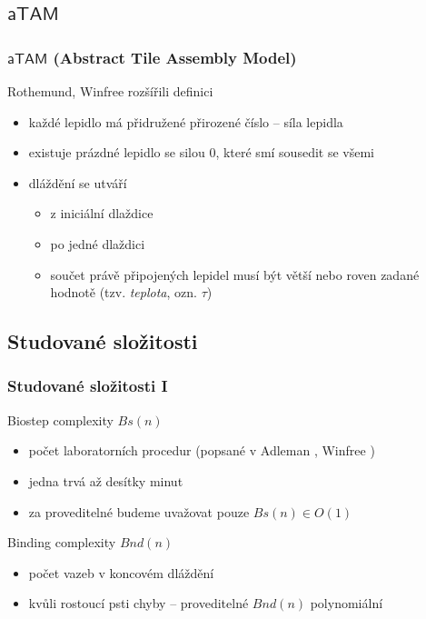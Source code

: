\documentclass[10pt]{beamer}
\newcommand{\atam}{\mathsf{aTAM}}
\theoremstyle{definition}
\theoremstyle{remark}
\begin{document}
\subsection{$\atam$}
\begin{frame}
\frametitle{$\atam$ (Abstract Tile Assembly Model)}
	Rothemund, Winfree rozšířili definici
	\begin{itemize}
		\item každé lepidlo má přidružené přirozené číslo -- síla lepidla
		\item existuje prázdné lepidlo se silou 0, které smí sousedit se všemi
		\item dláždění se utváří
		\begin{itemize}
			\item z iniciální dlaždice
			\item po jedné dlaždici
			\item součet právě připojených lepidel musí být větší nebo roven zadané hodnotě (tzv. {\em teplota}, ozn. $\tau$)
		\end{itemize}
	\end{itemize}
\end{frame}

\subsection{Studované složitosti}
\begin{frame}
\frametitle{Studované složitosti I}
	Biostep complexity $Bs(n)$
	\begin{itemize}
		\item počet laboratorních procedur (popsané v Adleman \cite{adleman95biostep}, Winfree \cite{winfree_phd})
		\item jedna trvá až desítky minut
		\item za proveditelné budeme uvažovat pouze $Bs(n) \in O(1)$
	\end{itemize}
	Binding complexity $Bnd(n)$
	\begin{itemize}
		\item počet vazeb v koncovém dláždění
		\item kvůli rostoucí psti chyby -- proveditelné $Bnd(n)$ polynomiální
	\end{itemize}
\end{frame}
\end{document}
